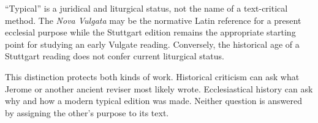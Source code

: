 ``Typical'' is a juridical and liturgical status, not the name of a text-critical method. The \emph{Nova Vulgata} may be the normative Latin reference for a present ecclesial purpose while the Stuttgart edition remains the appropriate starting point for studying an early Vulgate reading. Conversely, the historical age of a Stuttgart reading does not confer current liturgical status.


This distinction protects both kinds of work. Historical criticism can ask what Jerome or another ancient reviser most likely wrote. Ecclesiastical history can ask why and how a modern typical edition was made. Neither question is answered by assigning the other's purpose to its text.
